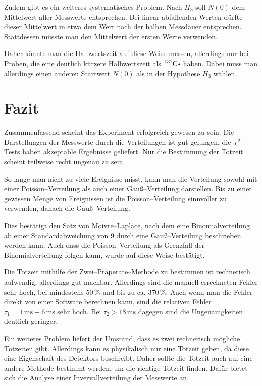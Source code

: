 \documentclass[12pt,a4paper]{scrartcl}
\numberwithin{equation}{section} %
\begin{document}
Zudem gibt es ein weiteres systematisches Problem. Nach $H_3$ soll $N(0)$ dem Mittelwert aller Messwerte entsprechen. Bei linear abfallenden Werten dürfte dieser Mittelwert in etwa dem Wert nach der halben Messdauer entsprechen. Stattdessen müsste man den Mittelwert der ersten Werte verwenden.

Daher könnte man die Halbwertszeit auf diese Weise messen, allerdings nur bei Proben, die eine deutlich kürzere Halbwertszeit als $\ce{^{137}Cs}$ haben. Dabei muss man allerdings einen anderen Startwert $N(0)$ als in der Hypothese $H_3$ wählen.

\clearpage
\hypertarget{fazit}{%
\section{Fazit}\label{fazit}}
Zusammenfassend scheint das Experiment erfolgreich gewesen zu sein. Die Darstellungen der Messwerte durch die Verteilungen ist gut gelungen, die $\chi^2$--Tests haben akzeptable Ergebnisse geliefert. Nur die Bestimmung der Totzeit scheint teilweise recht ungenau zu sein.

So lange man nicht zu viele Ereignisse misst, kann man die Verteilung sowohl mit einer Poisson--Verteilung als auch einer Gauß--Verteilung darstellen. Bis zu einer gewissen Menge von Ereignissen ist die Poisson--Verteilung sinnvoller zu verwenden, danach die Gauß--Verteilung.

Dies bestätigt den Satz von Moivre--Laplace, nach dem eine Binomialverteilung ab einer Standardabweichung von $9$ durch eine Gauß--Verteilung beschrieben werden kann. Auch dass die Poisson--Verteilung als Grenzfall der Binomialverteilung folgen kann, wurde auf diese Weise bestätigt.

Die Totzeit mithilfe der Zwei--Präperate--Methode zu bestimmen ist rechnerisch aufwendig, allerdings gut machbar. Allerdings sind die manuell errechneten Fehler sehr hoch, bei mindestens $50\,\%$ und bis zu ca. $370\,\%$. Auch wenn man die Fehler direkt von einer Software berechnen kann, sind die relativen Fehler $\tau_1=1\mathrm{\,ms}-6\mathrm{\,ms}$ sehr hoch. Bei $\tau_2>18\mathrm{\,ms}$ dagegen sind die Ungenauigkeiten deutlich geringer.

Ein weiteres Problem liefert der Umstand, dass es zwei rechnerisch mögliche Totzeiten gibt. Allerdings kann es physikalisch nur eine Totzeit geben, da diese eine Eigenschaft des Detektors beschreibt. Daher sollte die Totzeit auch auf eine andere Methode bestimmt werden, um die richtige Totzeit finden. Dafür bietet sich die Analyse einer Invervallverteilung der Messwerte an.
\end{document}

